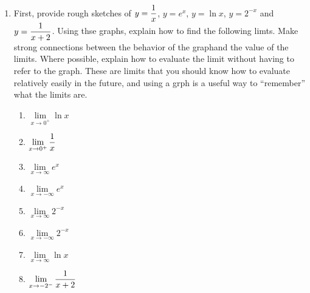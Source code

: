 \begin{enumerate}
\item First, provide rough sketches of $\displaystyle y={1 \over x}$, $y=e^x$, $y=\ln x$, $y=2^{-x}$ and $\displaystyle y={1\over {x+2}}$.  Using thse graphs, explain how to find the following limts.  Make strong connections between the behavior of the graphand the value of the limits.  Where possible, explain how to evaluate the limit without having to refer to the graph.  These are limits that you should know how to evaluate relatively easily in the future, and using a grph is a useful way to ``remember'' what the limits are.
\begin{enumerate}
\item $\displaystyle\mathop {\lim }\limits_{x \to 0^ +  } \ln x$
\item $\displaystyle\mathop {\lim }\limits_{x \to 0^ +  } {1 \over x}$
\item $\displaystyle\mathop {\lim }\limits_{x \to \infty  } {e^x}$
\item $\displaystyle\mathop {\lim }\limits_{x \to -\infty  } {e^x}$
\item $\displaystyle\mathop {\lim }\limits_{x \to \infty  } {2^{-x}}$
\item $\displaystyle\mathop {\lim }\limits_{x \to -\infty  } {2^{-x}}$
\item $\displaystyle\mathop {\lim }\limits_{x \to \infty  } \ln x$
\item $\displaystyle\mathop {\lim }\limits_{x \to -2^-  } {1\over {x+2}}$
\end{enumerate}


\end{enumerate}  

